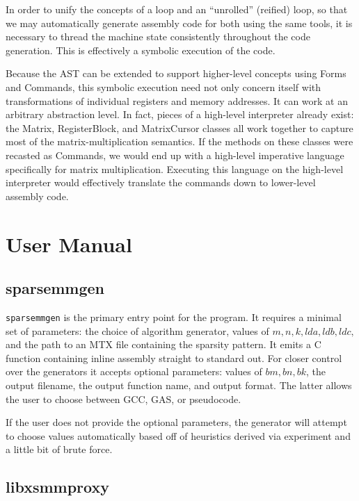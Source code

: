In order to unify the concepts of a loop and an ``unrolled'' (reified) loop, so that we may automatically generate assembly code for both using the same tools, it is necessary to thread the machine state consistently throughout the code generation. This is effectively a symbolic execution of the code. 

Because the AST can be extended to support higher-level concepts using Forms and Commands, this symbolic execution need not only concern itself with transformations of individual registers and memory addresses. It can work at an arbitrary abstraction level. In fact, pieces of a high-level interpreter already exist: the Matrix, RegisterBlock, and MatrixCursor classes all work together to capture most of the matrix-multiplication semantics. If the methods on these classes were recasted as Commands, we would end up with a high-level imperative language specifically for matrix multiplication. Executing this language on the high-level interpreter would effectively translate the commands down to lower-level assembly code. 


\section{User Manual}



\subsection{sparsemmgen}

\texttt{sparsemmgen} is the primary entry point for the program. It requires a minimal set of parameters: the choice of algorithm generator, values of $m, n, k, lda, ldb, ldc,$ and the path to an MTX file containing the sparsity pattern. It emits a C function containing inline assembly straight to standard out. For closer control over the generators it accepts optional parameters: values of $bm, bn, bk$, the output filename, the output function name, and output format. The latter allows the user to choose between GCC, GAS, or pseudocode.

If the user does not provide the optional parameters, the generator will attempt to choose values automatically based off of heuristics derived via experiment and a little bit of brute force. 


\subsection{libxsmmproxy}

